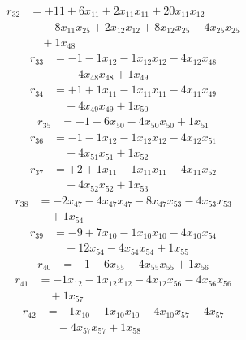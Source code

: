 \[\begin{aligned}
r_{32} &= + 11 + 6 x_{11} + 2 x_{11} x_{11} + 20 x_{11} x_{12} \\
 &\quad - 8 x_{11} x_{25} + 2 x_{12} x_{12} + 8 x_{12} x_{25} - 4 x_{25} x_{25} \\
 &\quad + 1 x_{48}
\end{aligned}\]
\[\begin{aligned}
r_{33} &= - 1 - 1 x_{12} - 1 x_{12} x_{12} - 4 x_{12} x_{48} \\
 &\quad - 4 x_{48} x_{48} + 1 x_{49}
\end{aligned}\]
\[\begin{aligned}
r_{34} &= + 1 + 1 x_{11} - 1 x_{11} x_{11} - 4 x_{11} x_{49} \\
 &\quad - 4 x_{49} x_{49} + 1 x_{50}
\end{aligned}\]
\[\begin{aligned}
r_{35} &= - 1 - 6 x_{50} - 4 x_{50} x_{50} + 1 x_{51}
\end{aligned}\]
\[\begin{aligned}
r_{36} &= - 1 - 1 x_{12} - 1 x_{12} x_{12} - 4 x_{12} x_{51} \\
 &\quad - 4 x_{51} x_{51} + 1 x_{52}
\end{aligned}\]
\[\begin{aligned}
r_{37} &= + 2 + 1 x_{11} - 1 x_{11} x_{11} - 4 x_{11} x_{52} \\
 &\quad - 4 x_{52} x_{52} + 1 x_{53}
\end{aligned}\]
\[\begin{aligned}
r_{38} &= - 2 x_{47} - 4 x_{47} x_{47} - 8 x_{47} x_{53} - 4 x_{53} x_{53} \\
 &\quad + 1 x_{54}
\end{aligned}\]
\[\begin{aligned}
r_{39} &= - 9 + 7 x_{10} - 1 x_{10} x_{10} - 4 x_{10} x_{54} \\
 &\quad + 12 x_{54} - 4 x_{54} x_{54} + 1 x_{55}
\end{aligned}\]
\[\begin{aligned}
r_{40} &= - 1 - 6 x_{55} - 4 x_{55} x_{55} + 1 x_{56}
\end{aligned}\]
\[\begin{aligned}
r_{41} &= - 1 x_{12} - 1 x_{12} x_{12} - 4 x_{12} x_{56} - 4 x_{56} x_{56} \\
 &\quad + 1 x_{57}
\end{aligned}\]
\[\begin{aligned}
r_{42} &= - 1 x_{10} - 1 x_{10} x_{10} - 4 x_{10} x_{57} - 4 x_{57} \\
 &\quad - 4 x_{57} x_{57} + 1 x_{58}
\end{aligned}\]
